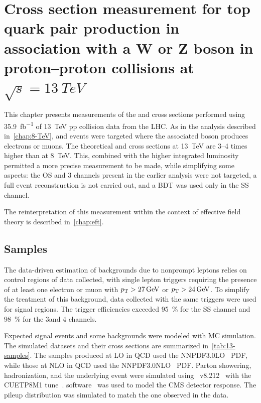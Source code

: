 \chapter{Cross section measurement for top quark pair production in association with a W or Z boson
in proton--proton collisions at $\sqrt{s}=\SI{13}{TeV}$}
\label{chap:13-TeV}
This chapter presents measurements of the \ttW and \ttZ cross sections performed using
\SI{35.9}{fb^{-1}} of \SI{13}{\TeV} pp collision data from the LHC. As in the analysis described
in~\cref{chap:8-TeV}, \ttW and \ttZ events were targeted where the associated boson produces
electrons or muons. The theoretical \ttW and \ttZ cross sections at \SI{13}{TeV} are \numrange{3}{4}
times higher than at \SI{8}{TeV}. This, combined with the higher integrated luminosity permitted a
more precise measurement to be made, while simplifying some aspects: the OS \ttZ and 3\lep \ttW
channels present in the earlier analysis were not targeted, a full event reconstruction is not
carried out, and a BDT was used only in the SS \ttW channel.

The reinterpretation of this measurement within the context of effective field theory is described
in~\cref{chap:eft}.

\section{Samples}
The data-driven estimation of backgrounds due to nonprompt leptons relies on control regions of data
collected, with single lepton triggers requiring the presence of at least one electron or muon with
$p_\text{T} > \SI{27}{GeV}$ or $p_\text{T} > \SI{24}{GeV}$. To simplify the treatment of this background, data
collected with the same triggers were used for signal regions. The trigger efficiencies exceeded
\SI{95}{\percent} for the SS \ttW channel and \SI{98}{\percent} for the 3\lep and 4\lep \ttZ
channels.

Expected signal events and some backgrounds were modeled with MC simulation. The simulated datasets
and their cross sections are summarized in~\cref{tab:13-samples}. The samples produced at LO in QCD
used the NNPDF3.0LO~\cite{Ball:2014uwa} PDF, while those at NLO in QCD used the
NNPDF3.0NLO~\cite{Ball:2014uwa} PDF. Parton showering, hadronization, and the underlying event were
simulated using \pythia~v8.212~\cite{Sjostrand:2007gs,Sjostrand:2014zea} with the CUETP8M1
tune~\cite{Skands:2014pea,CMS-PAS-GEN-14-001}. \geant software~\cite{Agostinelli:2002hh} was used to
model the CMS detector response. The pileup distribution was simulated to match the one observed in
the data.


